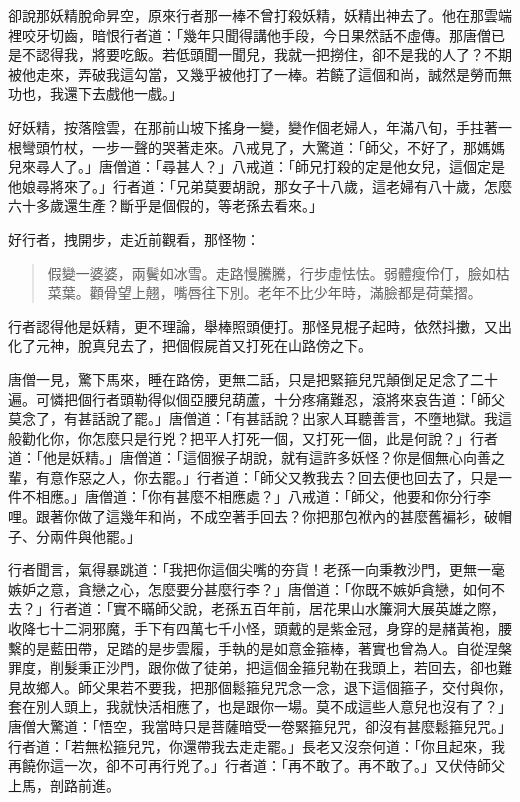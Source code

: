 卻說那妖精脫命昇空，原來行者那一棒不曾打殺妖精，妖精出神去了。他在那雲端裡咬牙切齒，暗恨行者道：「幾年只聞得講他手段，今日果然話不虛傳。那唐僧已是不認得我，將要吃飯。若低頭聞一聞兒，我就一把撈住，卻不是我的人了？不期被他走來，弄破我這勾當，又幾乎被他打了一棒。若饒了這個和尚，誠然是勞而無功也，我還下去戲他一戲。」

好妖精，按落陰雲，在那前山坡下搖身一變，變作個老婦人，年滿八旬，手拄著一根彎頭竹杖，一步一聲的哭著走來。八戒見了，大驚道：「師父，不好了，那媽媽兒來尋人了。」唐僧道：「尋甚人？」八戒道：「師兄打殺的定是他女兒，這個定是他娘尋將來了。」行者道：「兄弟莫要胡說，那女子十八歲，這老婦有八十歲，怎麼六十多歲還生產？斷乎是個假的，等老孫去看來。」

好行者，拽開步，走近前觀看，那怪物：
\begin{quote}
假變一婆婆，兩鬢如冰雪。走路慢騰騰，行步虛怯怯。弱體瘦伶仃，臉如枯菜葉。顴骨望上翹，嘴唇往下別。老年不比少年時，滿臉都是荷葉摺。
\end{quote}

行者認得他是妖精，更不理論，舉棒照頭便打。那怪見棍子起時，依然抖擻，又出化了元神，脫真兒去了，把個假屍首又打死在山路傍之下。

唐僧一見，驚下馬來，睡在路傍，更無二話，只是把緊箍兒咒顛倒足足念了二十遍。可憐把個行者頭勒得似個亞腰兒葫蘆，十分疼痛難忍，滾將來哀告道：「師父莫念了，有甚話說了罷。」唐僧道：「有甚話說？出家人耳聽善言，不墮地獄。我這般勸化你，你怎麼只是行兇？把平人打死一個，又打死一個，此是何說？」行者道：「他是妖精。」唐僧道：「這個猴子胡說，就有這許多妖怪？你是個無心向善之輩，有意作惡之人，你去罷。」行者道：「師父又教我去？回去便也回去了，只是一件不相應。」唐僧道：「你有甚麼不相應處？」八戒道：「師父，他要和你分行李哩。跟著你做了這幾年和尚，不成空著手回去？你把那包袱內的甚麼舊褊衫，破帽子、分兩件與他罷。」

行者聞言，氣得暴跳道：「我把你這個尖嘴的夯貨！老孫一向秉教沙門，更無一毫嫉妒之意，貪戀之心，怎麼要分甚麼行李？」唐僧道：「你既不嫉妒貪戀，如何不去？」行者道：「實不瞞師父說，老孫五百年前，居花果山水簾洞大展英雄之際，收降七十二洞邪魔，手下有四萬七千小怪，頭戴的是紫金冠，身穿的是赭黃袍，腰繫的是藍田帶，足踏的是步雲履，手執的是如意金箍棒，著實也曾為人。自從涅槃罪度，削髮秉正沙門，跟你做了徒弟，把這個金箍兒勒在我頭上，若回去，卻也難見故鄉人。師父果若不要我，把那個鬆箍兒咒念一念，退下這個箍子，交付與你，套在別人頭上，我就快活相應了，也是跟你一場。莫不成這些人意兒也沒有了？」唐僧大驚道：「悟空，我當時只是菩薩暗受一卷緊箍兒咒，卻沒有甚麼鬆箍兒咒。」行者道：「若無松箍兒咒，你還帶我去走走罷。」長老又沒奈何道：「你且起來，我再饒你這一次，卻不可再行兇了。」行者道：「再不敢了。再不敢了。」又伏侍師父上馬，剖路前進。

